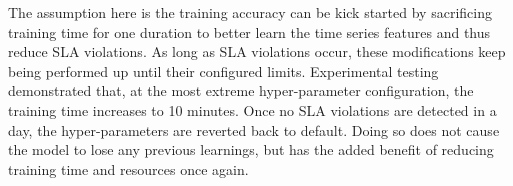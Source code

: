 The assumption here is the training accuracy can be kick started by sacrificing training time for one duration to better learn the time series features and thus reduce SLA violations. As long as SLA violations occur, these modifications keep being performed up until their configured limits. Experimental testing demonstrated that, at the most extreme hyper-parameter configuration, the training time increases to 10 minutes. Once no SLA violations are detected in a day, the hyper-parameters are reverted back to default. Doing so does not cause the model to lose any previous learnings, but has the added benefit of reducing training time and resources once again.